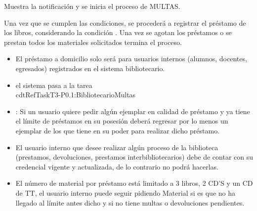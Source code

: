 \begin{PDescripcion}
\begin{enumerate}
      \Ppaso[\itarea]  Muestra la notificación  y se inicia el proceso de MULTAS.

      \Ppaso[\itarea]  Una vez que se cumplen las condiciones, se procederá a registrar el préstamo de los libros, considerando la condición . Una vez se agotan los préstamos o se prestan todos los materiales solicitados termina el proceso.

	\begin{itemize}
		\item  {}El préstamo a domicilio solo será para usuarios internos (alumnos, docentes,
egresados) registrados en el sistema bibliotecario.
	  \item  {} el sistema pasa a la tarea \\cdtRefTask{T3-P0.1:Bibliotecario}{Multas}
	  \item {} : Si un usuario quiere pedir algún ejemplar en calidad de préstamo y ya tiene el límite de préstamos en su posesión deberá regresar por lo menos un ejemplar de los que tiene en su poder para realizar dicho préstamo.
	 \item {}  El usuario interno que desee realizar algún proceso de la biblioteca (prestamos, devoluciones, prestamos interbibliotecarios) debe de contar con su credencial vigente y actualizada, de lo contrario no podrá hacerlas.
	 \item {}El número de material por préstamo está limitado a 3 libros, 2 CD'S y un CD de TT, el usuario interno puede seguir pidiendo Material si es que no ha llegado al límite antes dicho y si no tiene multas o devoluciones pendientes.


\end{itemize}
\end{enumerate}
\end{PDescripcion}
